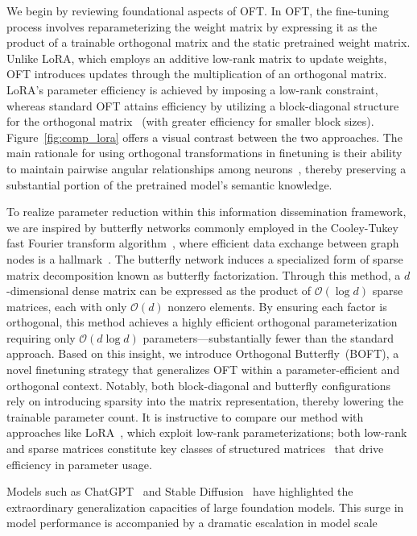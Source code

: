 We begin by reviewing foundational aspects of OFT. In OFT, the fine-tuning process involves reparameterizing the weight matrix by expressing it as the product of a trainable orthogonal matrix and the static pretrained weight matrix. Unlike LoRA, which employs an additive low-rank matrix to update weights, OFT introduces updates through the multiplication of an orthogonal matrix. LoRA’s parameter efficiency is achieved by imposing a low-rank constraint, whereas standard OFT attains efficiency by utilizing a block-diagonal structure for the orthogonal matrix~\cite{qiu2023controlling} (with greater efficiency for smaller block sizes). Figure~\ref{fig:comp_lora} offers a visual contrast between the two approaches. The main rationale for using orthogonal transformations in finetuning is their ability to maintain pairwise angular relationships among neurons~\cite{liu2018learning,liu2021orthogonal,qiu2023controlling}, thereby preserving a substantial portion of the pretrained model’s semantic knowledge. 

To realize parameter reduction within this information dissemination framework, we are inspired by butterfly networks commonly employed in the Cooley-Tukey fast Fourier transform algorithm~\cite{cooley1965algorithm}, where efficient data exchange between graph nodes is a hallmark~\cite{klasing1994broadcasting}. The butterfly network induces a specialized form of sparse matrix decomposition known as butterfly factorization. Through this method, a $d$-dimensional dense matrix can be expressed as the product of $\mathcal{O}(\log d)$ sparse matrices, each with only $\mathcal{O}(d)$ nonzero elements. By ensuring each factor is orthogonal, this method achieves a highly efficient orthogonal parameterization requiring only $\mathcal{O}(d\log d)$ parameters—substantially fewer than the standard approach. Based on this insight, we introduce Orthogonal Butterfly~(BOFT), a novel finetuning strategy that generalizes OFT within a parameter-efficient and orthogonal context. Notably, both block-diagonal and butterfly configurations rely on introducing sparsity into the matrix representation, thereby lowering the trainable parameter count. It is instructive to compare our method with approaches like LoRA~\cite{hulora2022}, which exploit low-rank parameterizations; both low-rank and sparse matrices constitute key classes of structured matrices~\cite{candes2011robust} that drive efficiency in parameter usage.

Models such as ChatGPT~\cite{brown2020language,chen2021evaluating} and Stable Diffusion~\cite{rombach2022high} have highlighted the extraordinary generalization capacities of large foundation models. This surge in model performance is accompanied by a dramatic escalation in model scale

